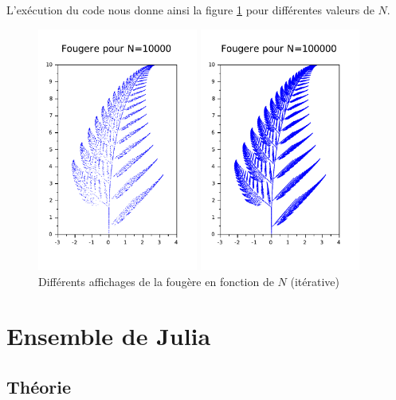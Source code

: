 \documentclass[a4paper,10pt]{report}
\begin{document}
L'exécution du code nous donne ainsi la figure \ref{affichage_fougere} pour différentes valeurs de $N$.
\begin{figure}[H]
\caption{Différents affichages de la fougère en fonction de $N$ (itérative)}
   \begin{minipage}[c]{.49\linewidth}
   \centering
      \includegraphics[height=8cm]{graphfougere.pdf}
   \end{minipage} \hfill
   \begin{minipage}[c]{.49\linewidth}
   \centering
      \includegraphics[height=8cm]{graphfougere_2.pdf}
   \end{minipage}
\label{affichage_fougere}
\end{figure}

\section{Ensemble de Julia}

\subsection{Théorie}
\end{document}
